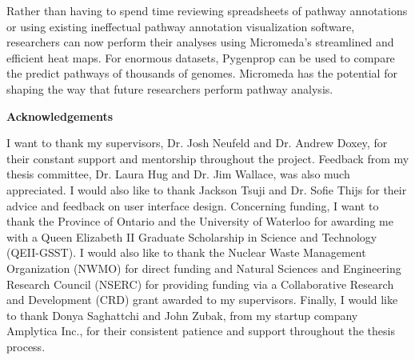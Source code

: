 Rather than having to spend time reviewing spreadsheets of pathway annotations or using existing ineffectual pathway annotation visualization software, researchers can now perform their analyses using Micromeda's streamlined and efficient heat maps. For enormous datasets, Pygenprop can be used to compare the predict pathways of thousands of genomes. Micromeda has the potential for shaping the way that future researchers perform pathway analysis.

\cleardoublepage


\begin{center}\textbf{Acknowledgements}\end{center}

I want to thank my supervisors, Dr. Josh Neufeld and Dr. Andrew Doxey, for their constant support and mentorship throughout the project. Feedback from my thesis committee, Dr. Laura Hug and Dr. Jim Wallace, was also much appreciated. I would also like to thank Jackson Tsuji and Dr. Sofie Thijs for their advice and feedback on user interface design. Concerning funding, I want to thank the Province of Ontario and the University of Waterloo for awarding me with a Queen Elizabeth II Graduate Scholarship in Science and Technology (QEII-GSST). I would also like to thank the Nuclear Waste Management Organization (NWMO) for direct funding and Natural Sciences and Engineering Research Council (NSERC) for providing funding via a Collaborative Research and Development (CRD) grant awarded to my supervisors. Finally, I would like to thank Donya Saghattchi and John Zubak, from my startup company Amplytica Inc., for their consistent patience and support throughout the thesis process.

\cleardoublepage

\renewcommand\contentsname{Table of Contents}
\tableofcontents
\cleardoublepage
{}    %

\listoffigures
\cleardoublepage
{}		%

\listoftables
\cleardoublepage
{}		%

\printglossaries
\cleardoublepage
{}		%


